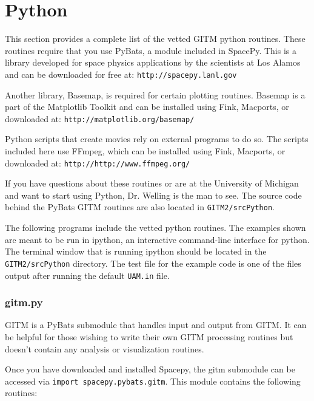 \section{Python}
\label{python.sec}

This section provides a complete list of the vetted GITM python routines.  These routines require that you use PyBats, a module included in SpacePy.  This is a library developed for space physics applications by the scientists at Los Alamos and can be downloaded for free at: 
{\tt http://spacepy.lanl.gov}

Another library, Basemap, is required for certain plotting routines.  Basemap is a part of the Matplotlib Toolkit and can be installed using Fink, Macports, or downloaded at:
{\tt http://matplotlib.org/basemap/}

Python scripts that create movies rely on external programs to do so.  The scripts included here use FFmpeg, which can be installed using Fink, Macports, or downloaded at: {\tt http://http://www.ffmpeg.org/}

If you have questions about these routines or are at the University of Michigan and want to start using Python, Dr. Welling is the man to see.  The source code behind the PyBats GITM routines are also located in {\tt GITM2/srcPython}.

The following programs include the vetted python routines.  The examples shown are meant to be run in ipython, an interactive command-line interface for python.  The terminal window that is running ipython should be located in the {\tt GITM2/srcPython} directory.  The test file for the example code is one of the files output after running the default {\tt UAM.in} file.

\subsubsection{gitm.py}

GITM is a PyBats submodule that handles input and output from GITM.  It can be helpful for those wishing to write their own GITM processing routines but doesn't contain any analysis or visualization routines. 

Once you have downloaded and installed Spacepy, the gitm submodule can be accessed via {\tt import spacepy.pybats.gitm}.  This module contains the following routines:


